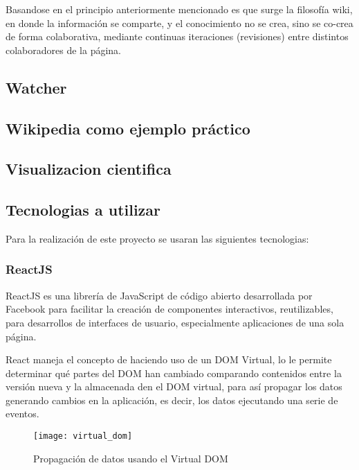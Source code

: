         Basandose en el principio anteriormente mencionado es que surge la filosofía wiki, en donde la información se comparte, y el conocimiento no se crea, sino se co-crea de forma colaborativa, mediante continuas iteraciones (revisiones) entre distintos colaboradores de la página.

    \subsection{Watcher}

    \subsection{Wikipedia como ejemplo práctico}

    \subsection{Visualizacion cientifica}


\subsection{Tecnologias a utilizar}

    Para la realización de este proyecto se usaran las siguientes tecnologias:

    \subsubsection{ReactJS}

        ReactJS es una librería de JavaScript de código abierto desarrollada por Facebook para facilitar la creación de componentes interactivos, reutilizables, para desarrollos de interfaces de usuario, especialmente aplicaciones de una sola página.

        React maneja el concepto de  haciendo uso de un DOM Virtual, lo le permite determinar qué partes del DOM han cambiado comparando contenidos entre la versión nueva y la almacenada den el DOM virtual, para así propagar los datos generando cambios en la aplicación, es decir, los datos  ejecutando una serie de eventos.\\

        \begin{figure}
            \texttt{[image: virtual\_dom]}
            \caption{Propagación de datos usando el Virtual DOM}
        \end{figure}
        

